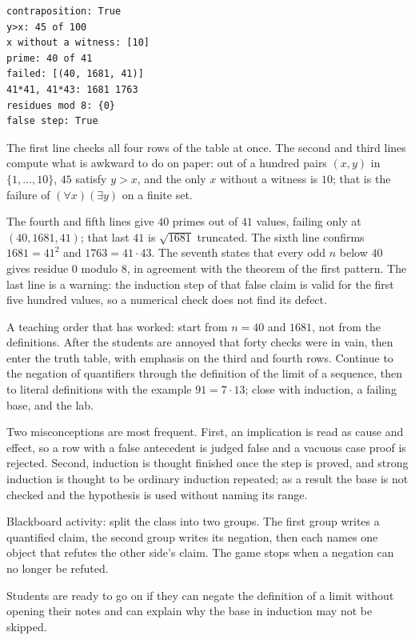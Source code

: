 \begin{verbatim}
contraposition: True
y>x: 45 of 100
x without a witness: [10]
prime: 40 of 41
failed: [(40, 1681, 41)]
41*41, 41*43: 1681 1763
residues mod 8: {0}
false step: True
\end{verbatim}

The first line checks all four rows of the table at once. The second and third lines compute
what is awkward to do on paper: out of a hundred pairs $(x,y)$ in
$\{1,\dots,10\}$, $45$ satisfy $y > x$, and the only $x$ without a witness is $10$;
that is the failure of $(\forall x)(\exists y)$ on a finite set.

The fourth and fifth lines give $40$ primes out of $41$ values, failing only at
$(40,1681,41)$; that last $41$ is $\sqrt{1681}$ truncated. The sixth line
confirms $1681 = 41^{2}$ and $1763 = 41 \cdot 43$. The seventh states that every odd
$n$ below $40$ gives residue $0$ modulo $8$, in agreement with the theorem of the first pattern. The last
line is a warning: the induction step of that false claim is valid for the first five hundred values,
so a numerical check does not find its defect.

\begin{untukdosen}
A teaching order that has worked: start from $n = 40$ and $1681$, not from the
definitions. After the students are annoyed that forty checks were in vain, then
enter the truth table, with emphasis on the third and fourth rows. Continue to
the negation of quantifiers through the definition of the limit of a sequence, then to literal definitions with the example
$91 = 7 \cdot 13$; close with induction, a failing base, and the lab.

Two misconceptions are most frequent. First, an implication is read as cause and effect, so a row
with a false antecedent is judged false and a vacuous case proof is rejected. Second, induction
is thought finished once the step is proved, and strong induction is thought to be ordinary induction
repeated; as a result the base is not checked and the hypothesis is used without naming
its range.

Blackboard activity: split the class into two groups. The first group writes a quantified claim,
the second group writes its negation, then each names one object that
refutes the other side's claim. The game stops when a negation can no longer be refuted.

Students are ready to go on if they can negate the definition of a limit without opening their notes
and can explain why the base in induction may not be skipped.
\end{untukdosen}

